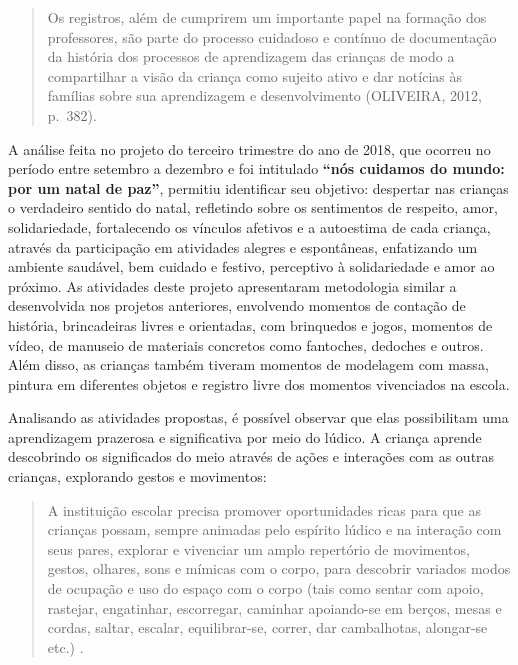 \begin{refsection}
    \begin{quotation}
        Os registros, além de cumprirem um importante papel na formação dos professores, são parte do processo cuidadoso e contínuo de documentação da história dos processos de aprendizagem das crianças de modo a compartilhar a visão da criança como sujeito ativo e dar notícias às famílias sobre sua aprendizagem e desenvolvimento (OLIVEIRA, 2012, p.~382). 
    \end{quotation}


    A análise feita no projeto do terceiro trimestre do ano de 2018, que ocorreu no período entre  setembro a dezembro e foi intitulado \textbf{“nós cuidamos do mundo: por um natal de paz”}, permitiu identificar seu objetivo: despertar nas crianças o verdadeiro sentido do natal, refletindo sobre os sentimentos de respeito, amor, solidariedade, fortalecendo os vínculos afetivos e a autoestima de cada criança, através da participação em atividades alegres e espontâneas, enfatizando um ambiente saudável, bem cuidado e festivo, perceptivo à solidariedade e amor ao próximo. As atividades deste projeto apresentaram metodologia similar a desenvolvida nos projetos anteriores, envolvendo momentos de contação de história, brincadeiras livres e orientadas, com brinquedos e jogos, momentos de vídeo, de manuseio de materiais concretos como fantoches, dedoches e outros. Além disso, as crianças também tiveram momentos de modelagem com massa, pintura em diferentes objetos e registro livre dos momentos vivenciados na escola. 

    Analisando as atividades propostas, é possível observar que elas possibilitam uma aprendizagem prazerosa e significativa por meio do lúdico. A criança aprende descobrindo os significados do meio através de ações e interações com as outras crianças, explorando gestos e movimentos: 

    \begin{quotation}
        A instituição escolar precisa promover oportunidades ricas para que as crianças possam, sempre animadas pelo espírito lúdico e na interação com seus pares, explorar e vivenciar um amplo repertório de movimentos, gestos, olhares, sons e mímicas com o corpo, para descobrir variados modos de ocupação e uso do espaço com o corpo (tais como sentar com apoio, rastejar, engatinhar, escorregar, caminhar apoiando-se em berços, mesas e cordas, saltar, escalar, equilibrar-se, correr, dar cambalhotas, alongar-se etc.) \cite[p.~41]{BaNacCurEF2017}.  
    \end{quotation}


\end{refsection}
